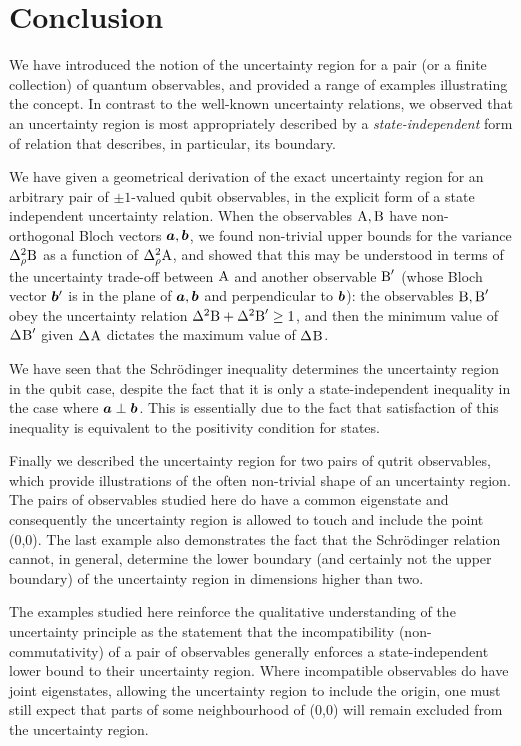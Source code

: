 \section{Conclusion} \label{sec:conclusion}
We have introduced the notion of the uncertainty region for a pair (or a finite collection) of quantum observables, and provided a range of examples illustrating the concept. In contrast to the well-known uncertainty relations, we observed that an uncertainty region is most appropriately described by a {\em state-independent} form of relation that describes, in particular, its boundary.

We have given a geometrical derivation of the exact uncertainty region for an  arbitrary pair of $\pm1$-valued qubit observables, in the explicit form of a state independent uncertainty relation.  When the observables $\operatorname{A},\operatorname{B}$ have non-orthogonal Bloch vectors $\bm{a},\bm{b}$, we found non-trivial upper bounds for the variance $\varr{\opb}$ as a function of $\varr{\opa}$, and showed that this may be understood in terms of the uncertainty trade-off between $\operatorname{A}$ and another observable $\operatorname{B}'$ (whose Bloch vector $\bm{b}'$ is in the plane of $\bm{a},\bm{b}$ and perpendicular to $\bm{b}$): the observables $\operatorname{B},\operatorname{B}'$ obey the uncertainty relation $\var{\opb}+\var{\opb'}\ge 1$, and then the minimum value of $\sdev{\opb'}$ given $\sdev{\opa}$ dictates the maximum value of $\sdev{\opb}$.

We have seen that the Schr\"odinger inequality determines the uncertainty region in the qubit case, despite the fact that it is only a state-independent inequality in the case where $\bm{a}\perp\bm{b}$. This is essentially due to the fact that satisfaction of this inequality is equivalent to the positivity condition for states.

Finally we described the uncertainty region for two pairs of qutrit observables, which provide illustrations of the often non-trivial shape of an uncertainty region. The pairs of observables studied here do have a common eigenstate and consequently the uncertainty region is allowed to touch and include the point (0,0). The last example also demonstrates the fact that the Schr\"odinger relation cannot, in general, determine the lower boundary (and certainly not the upper boundary) of the uncertainty region in dimensions higher than two.

The examples studied here reinforce the qualitative understanding of  the uncertainty principle  as the statement that the incompatibility (non-commutativity) of a pair of observables generally enforces a state-independent lower bound to their uncertainty region. Where incompatible observables do have joint eigenstates, allowing the uncertainty region to include the origin, one must still expect that parts of some neighbourhood of (0,0) will remain excluded from the uncertainty region. 

